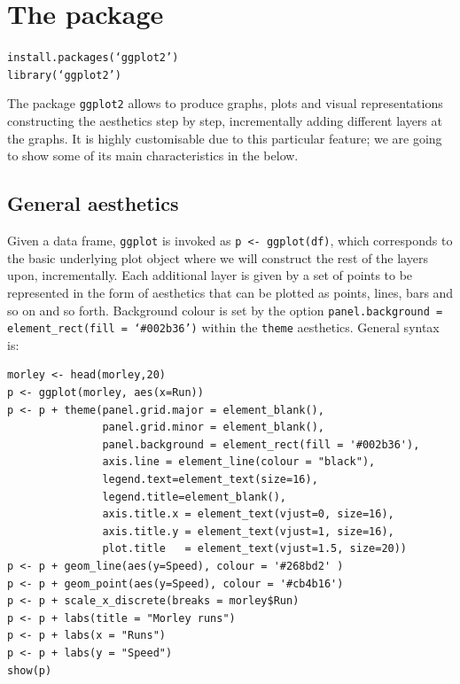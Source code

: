 \chapter{The  package}\label{sec: ggplot2}
\texttt{install.packages(`ggplot2')}\\
\texttt{library(`ggplot2')}
\bigskip 

The package \texttt{ggplot2} allows to produce
graphs, plots and visual representations
constructing the aesthetics step by step,
incrementally adding different layers at the graphs. 
It is highly customisable due to this particular feature; 
we are going to show some of its main characteristics
in the below.

\section{General aesthetics}
Given a data frame, \texttt{ggplot} is invoked 
as \texttt{p <- ggplot(df)}, which corresponds to the
basic underlying plot object where we will construct
the rest of the layers upon, incrementally. Each 
additional layer is given by a set of points to 
be represented in the form of aesthetics that can be
plotted as points, lines, bars and so on and so forth.
Background colour is set by the option
\texttt{panel.background = element\_rect(fill = `\#002b36')}
within the \texttt{theme} aesthetics. General syntax is:
\begin{verbatim}
morley <- head(morley,20)
p <- ggplot(morley, aes(x=Run))
p <- p + theme(panel.grid.major = element_blank(), 
               panel.grid.minor = element_blank(),
               panel.background = element_rect(fill = '#002b36'),
               axis.line = element_line(colour = "black"),
               legend.text=element_text(size=16),
               legend.title=element_blank(),
               axis.title.x = element_text(vjust=0, size=16),
               axis.title.y = element_text(vjust=1, size=16),
               plot.title   = element_text(vjust=1.5, size=20)) 
p <- p + geom_line(aes(y=Speed), colour = '#268bd2' )
p <- p + geom_point(aes(y=Speed), colour = '#cb4b16')
p <- p + scale_x_discrete(breaks = morley$Run)
p <- p + labs(title = "Morley runs")
p <- p + labs(x = "Runs")
p <- p + labs(y = "Speed")
show(p)
\end{verbatim}

